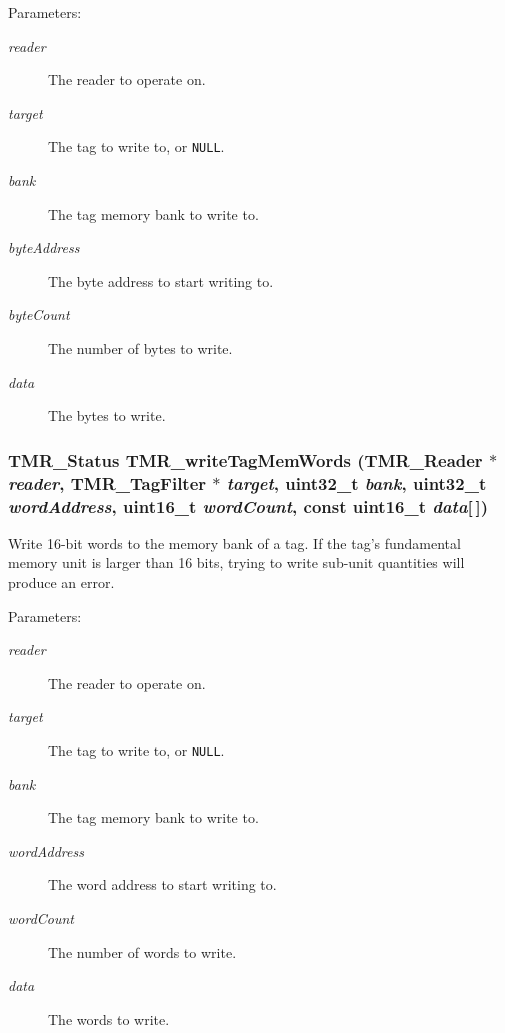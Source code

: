 \begin{Desc}
\item[Parameters:]
\begin{description}
\item[{\em reader}]The reader to operate on. \item[{\em target}]The tag to write to, or {\tt NULL}. \item[{\em bank}]The tag memory bank to write to. \item[{\em byteAddress}]The byte address to start writing to. \item[{\em byteCount}]The number of bytes to write. \item[{\em data}]The bytes to write. \end{description}
\end{Desc}
\hypertarget{group__reader_gbf70580fa19874585850653139ea17eb}{
\subsubsection[{TMR\_\-writeTagMemWords}]{\setlength{\rightskip}{0pt plus 5cm}TMR\_\-Status TMR\_\-writeTagMemWords ({\bf TMR\_\-Reader} $\ast$ {\em reader}, \/  {\bf TMR\_\-TagFilter} $\ast$ {\em target}, \/  uint32\_\-t {\em bank}, \/  uint32\_\-t {\em wordAddress}, \/  uint16\_\-t {\em wordCount}, \/  const uint16\_\-t {\em data}\mbox{[}$\,$\mbox{]})}}
\label{group__reader_gbf70580fa19874585850653139ea17eb}


Write 16-bit words to the memory bank of a tag. If the tag's fundamental memory unit is larger than 16 bits, trying to write sub-unit quantities will produce an error.

\begin{Desc}
\item[Parameters:]
\begin{description}
\item[{\em reader}]The reader to operate on. \item[{\em target}]The tag to write to, or {\tt NULL}. \item[{\em bank}]The tag memory bank to write to. \item[{\em wordAddress}]The word address to start writing to. \item[{\em wordCount}]The number of words to write. \item[{\em data}]The words to write. \end{description}
\end{Desc}
